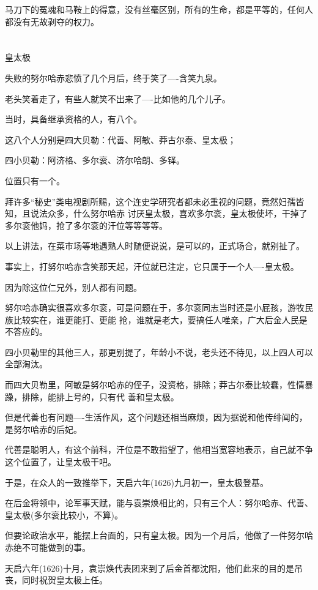\documentclass[11pt,a4paper,onecolumn]{article}
\begin{document}
马刀下的冤魂和马鞍上的得意，没有丝毫区别，所有的生命，都是平等的，任何人都没有无故剥夺的权力。

\section[\thesection]{}

皇太极

失败的努尔哈赤悲愤了几个月后，终于笑了----含笑九泉。

老头笑着走了，有些人就笑不出来了----比如他的几个儿子。

当时，具备继承资格的人，有八个。

这八个人分别是四大贝勒：代善、阿敏、莽古尔泰、皇太极；

四小贝勒：阿济格、多尔衮、济尔哈朗、多铎。

位置只有一个。

拜许多``秘史''类电视剧所赐，这个连史学研究者都未必重视的问题，竟然妇孺皆知，且说法众多，什么努尔哈赤
讨厌皇太极，喜欢多尔衮，皇太极使坏，干掉了多尔衮他妈，抢了多尔衮的汗位等等等等。

以上讲法，在菜市场等地遇熟人时随便说说，是可以的，正式场合，就别扯了。

事实上，打努尔哈赤含笑那天起，汗位就已注定，它只属于一个人----皇太极。

因为除这位仁兄外，别人都有问题。

努尔哈赤确实很喜欢多尔衮，可是问题在于，多尔衮同志当时还是小屁孩，游牧民族比较实在，谁更能打、更能
抢，谁就是老大，要搞任人唯亲，广大后金人民是不答应的。

四小贝勒里的其他三人，那更别提了，年龄小不说，老头还不待见，以上四人可以全部淘汰。

而四大贝勒里，阿敏是努尔哈赤的侄子，没资格，排除；莽古尔泰比较蠢，性情暴躁，排除，能排上号的，只有代
善和皇太极。

但是代善也有问题----生活作风，这个问题还相当麻烦，因为据说和他传绯闻的，是努尔哈赤的后妃。

代善是聪明人，有这个前科，汗位是不敢指望了，他相当宽容地表示，自己就不争这个位置了，让皇太极干吧。

于是，在众人的一致推举下，天启六年(1626)九月初一，皇太极登基。

在后金将领中，论军事天赋，能与袁崇焕相比的，只有三个人：努尔哈赤、代善、皇太极(多尔衮比较小，不算)。

但要论政治水平，能摆上台面的，只有皇太极。因为一个月后，他做了一件努尔哈赤绝不可能做到的事。

天启六年(1626)十月，袁崇焕代表团来到了后金首都沈阳，他们此来的目的是吊丧，同时祝贺皇太极上任。
\end{document}
